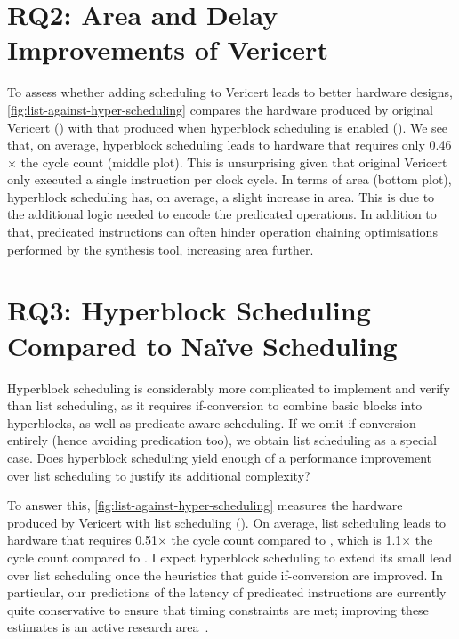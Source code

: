 \section{RQ2: Area and Delay Improvements of Vericert}

To assess whether adding scheduling to Vericert leads to better hardware
designs, \cref{fig:list-against-hyper-scheduling} compares the hardware produced
by original Vericert (\VericertBase{}) with that produced when hyperblock
scheduling is enabled (\VericertHyper{}). We see that, on average, hyperblock
scheduling leads to hardware that requires only 0.46$\times$ the cycle count
(middle plot). This is unsurprising given that original Vericert only executed a
single instruction per clock cycle. In terms of area (bottom plot), hyperblock
scheduling has, on average, a slight increase in area.  This is due to the
additional logic needed to encode the predicated operations.  In addition to
that, predicated instructions can often hinder operation chaining optimisations
performed by the synthesis tool, increasing area further.

\section{RQ3: Hyperblock Scheduling Compared to Na\"ive Scheduling}

Hyperblock scheduling is considerably more complicated to implement and verify
than list scheduling, as it requires if-conversion to combine basic blocks into
hyperblocks, as well as predicate-aware scheduling. If we omit if-conversion
entirely (hence avoiding predication too), we obtain list scheduling as a
special case. Does hyperblock scheduling yield enough of a performance
improvement over list scheduling to justify its additional complexity?

To answer this, \cref{fig:list-against-hyper-scheduling} measures the hardware
produced by Vericert with list scheduling (\VericertList{}). On average, list
scheduling leads to hardware that requires 0.51$\times$ the cycle count compared
to \VericertBase{}, which is 1.1$\times$ the cycle count compared to
\VericertHyper{}. I expect hyperblock scheduling to extend its small lead over
list scheduling once the heuristics that guide if-conversion are improved.  In
particular, our predictions of the latency of predicated instructions are
currently quite conservative to ensure that timing constraints are met;
improving these estimates is an active research
area~\cite{tan15_mappin_lut_fpgas,rizzi23_iterat_method_mappin_aware_frequen,wang23_mapbuf,ustun20_accur_fpga_hls,zheng14_fast_effec_placem_routin_direc}.

